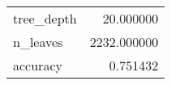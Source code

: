 \begin{tabular}{lr}
\toprule
 &  \\
\midrule
tree\_depth & 20.000000 \\
n\_leaves & 2232.000000 \\
accuracy & 0.751432 \\
\bottomrule
\end{tabular}
